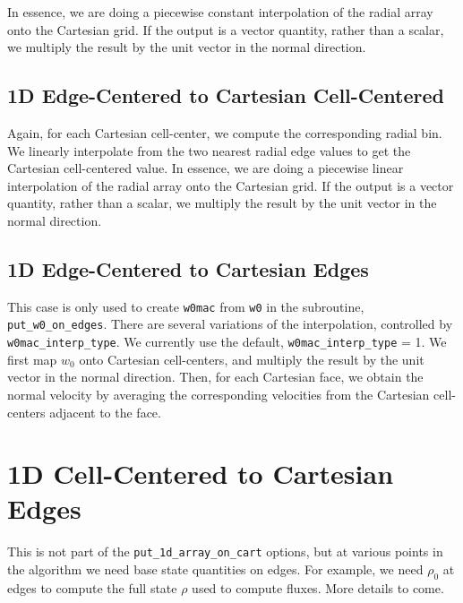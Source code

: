 In essence, we are doing a piecewise constant interpolation of the radial array 
onto the Cartesian grid.  If the output is a vector quantity, rather than a 
scalar, we multiply the result by the unit vector in the normal direction.
\subsection{1D Edge-Centered to Cartesian Cell-Centered}
\label{Sec:1D Edge-Centered to Cartesian Cell-Centered}
Again, for each Cartesian cell-center, we compute the corresponding radial
bin.  We linearly interpolate from the two nearest radial edge values 
to get the Cartesian cell-centered value.  In essence,
we are doing a piecewise linear interpolation of the radial array onto the 
Cartesian grid.  If the output is a vector quantity, rather than a scalar, we
multiply the result by the unit vector in the normal direction.
\subsection{1D Edge-Centered to Cartesian Edges}
\label{Sec:1D Edge-Centered to Cartesian Edges}
This case is only used to create {\tt w0mac} from {\tt w0} in the 
subroutine, {\tt put\_w0\_on\_edges}.  There are several variations 
of the interpolation, controlled by {\tt w0mac\_interp\_type}.  We 
currently use the default, {\tt w0mac\_interp\_type} = 1.  We first 
map $w_0$ onto Cartesian cell-centers, and multiply the result by 
the unit vector in the normal direction.  Then, for each Cartesian 
face, we obtain the normal velocity by averaging the corresponding 
velocities from the Cartesian cell-centers adjacent to the face.
\section{1D Cell-Centered to Cartesian Edges}
This is not part of the {\tt put\_1d\_array\_on\_cart} options, 
but at various points in the algorithm we need base state quantities on 
edges.  For example, we need $\rho_0$ at edges to compute the full 
state $\rho$ used to compute fluxes.  More details to come.
